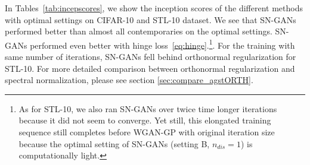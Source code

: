 \documentclass{article}
\begin{document}
In Tables~\ref{tab:incepscores}, we show the inception scores of the different methods with optimal settings on CIFAR-10 and STL-10 dataset.
We see that SN-GANs performed better than almost all contemporaries on the optimal settings. SN-GANs performed even better with hinge loss~\eqref{eq:hinge}.\footnote{As for STL-10, we also ran SN-GANs over twice time longer iterations because it did not seem to converge. 
Yet still, this elongated training sequence still completes before WGAN-GP with original iteration size because the optimal setting of SN-GANs (setting B, $n_{dis} =1$) is computationally light.}.
For the training with same number of iterations, SN-GANs fell behind orthonormal regularization for STL-10. For more detailed comparison between orthonormal regularization and spectral normalization, please see section \ref{sec:compare_agstORTH}. 
\end{document}
